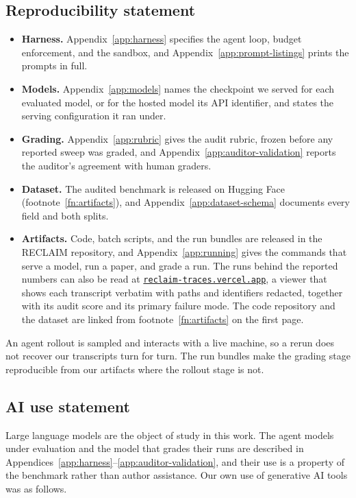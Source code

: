 \documentclass{article} %
\begin{document}
\subsection*{Reproducibility statement}

\begin{itemize}
\item \textbf{Harness.} Appendix~\ref{app:harness} specifies the agent loop,
budget enforcement, and the sandbox, and Appendix~\ref{app:prompt-listings} prints the prompts in full.
\item \textbf{Models.} Appendix~\ref{app:models} names the checkpoint we served
for each evaluated model, or for the hosted model its API identifier, and
states the serving configuration it ran under.
\item \textbf{Grading.} Appendix~\ref{app:rubric} gives the audit rubric,
frozen before any reported sweep was graded, and
Appendix~\ref{app:auditor-validation} reports the auditor's agreement with
human graders.
\item \textbf{Dataset.} The audited benchmark is released on Hugging Face
(footnote~\ref{fn:artifacts}), and Appendix~\ref{app:dataset-schema} documents
every field and both splits.
\item \textbf{Artifacts.} Code, batch scripts, and the run bundles
are released in the RECLAIM repository, and
Appendix~\ref{app:running} gives the commands that serve a model, run a
paper, and grade a run. The runs behind the reported numbers can also be
read at \href{https://reclaim-traces.vercel.app}{\nolinkurl{reclaim-traces.vercel.app}}, a viewer that
shows each transcript verbatim with paths and identifiers redacted, together
with its audit score and its primary failure mode. The code
repository and the dataset are linked from footnote~\ref{fn:artifacts} on the first page.
\end{itemize}

An agent rollout is sampled and interacts with a live machine, so a rerun does
not recover our transcripts turn for turn. The run bundles make the
grading stage reproducible from our artifacts where the rollout stage is not.

\subsection*{AI use statement}

Large language models are the object of study in this work. The agent models
under evaluation and the model that grades their runs are described in
Appendices~\ref{app:harness}--\ref{app:auditor-validation}, and their use is a
property of the benchmark rather than author assistance. Our own use of
generative AI tools was as follows.
\end{document}
